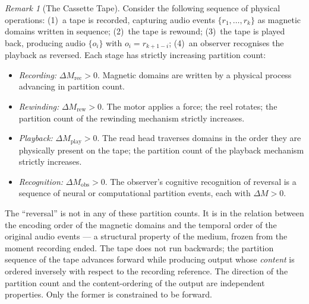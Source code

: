\documentclass[twocolumn,10pt,a4paper]{article}
\theoremstyle{thmstyle}
\theoremstyle{definition}
\theoremstyle{remark}
\newtheorem{remark}[theorem]{Remark}
\begin{document}
\begin{remark}[The Cassette Tape]
\label{rem:cassette}
Consider the following sequence of physical operations: (1)~a tape is recorded, capturing audio events $\{r_1, \ldots, r_k\}$ as magnetic domains written in sequence; (2)~the tape is rewound; (3)~the tape is played back, producing audio $\{o_i\}$ with $o_i = r_{k+1-i}$; (4)~an observer recognises the playback as reversed. Each stage has strictly increasing partition count:
\begin{itemize}[leftmargin=1.2em,itemsep=0.1em]
\item \textit{Recording:} $\Delta M_{\mathrm{rec}} > 0$. Magnetic domains are written by a physical process advancing in partition count.
\item \textit{Rewinding:} $\Delta M_{\mathrm{rew}} > 0$. The motor applies a force; the reel rotates; the partition count of the rewinding mechanism strictly increases.
\item \textit{Playback:} $\Delta M_{\mathrm{play}} > 0$. The read head traverses domains in the order they are physically present on the tape; the partition count of the playback mechanism strictly increases.
\item \textit{Recognition:} $\Delta M_{\mathrm{obs}} > 0$. The observer's cognitive recognition of reversal is a sequence of neural or computational partition events, each with $\Delta M > 0$.
\end{itemize}
The ``reversal'' is not in any of these partition counts. It is in the relation between the encoding order of the magnetic domains and the temporal order of the original audio events --- a structural property of the medium, frozen from the moment recording ended. The tape does not run backwards; the partition sequence of the tape advances forward while producing output whose \emph{content} is ordered inversely with respect to the recording reference. The direction of the partition count and the content-ordering of the output are independent properties. Only the former is constrained to be forward.
\end{remark}
\end{document}
